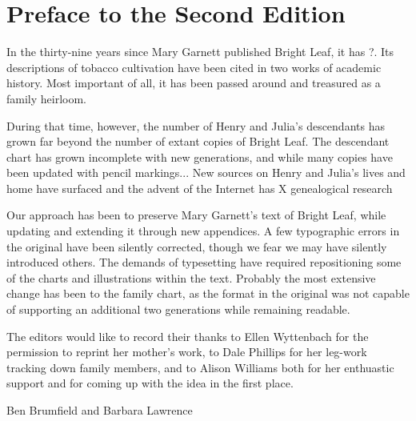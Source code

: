 
\chapter{Preface to the Second Edition}


In the thirty-nine years since Mary Garnett published Bright Leaf, it has ?.  Its descriptions of tobacco cultivation have been cited in two works of academic history.  Most important of all, it has been passed around and treasured as a family heirloom.

During that time, however, the number of Henry and Julia's descendants has grown far beyond the number of extant copies of Bright Leaf.  The descendant chart has grown incomplete with new generations, and while many copies have been updated with pencil markings...  New sources on Henry and Julia's lives and home have surfaced and the advent of the Internet has X genealogical research

Our approach has been to preserve Mary Garnett's text of Bright Leaf, while updating and extending it through new appendices.  A few typographic errors in the original have been silently corrected, though we fear we may have silently introduced others.  The demands of typesetting have required repositioning some of the charts and illustrations within the text.  Probably the most extensive change has been to the family chart, as the format in the original was not capable of supporting an additional two generations while remaining readable.

The editors would like to record their thanks to Ellen Wyttenbach for the permission to reprint her mother's work, to Dale Phillips for her leg-work tracking down family members, and to Alison Williams both for her enthuastic support and for coming up with the idea in the first place.

Ben Brumfield and Barbara Lawrence


\pagebreak
